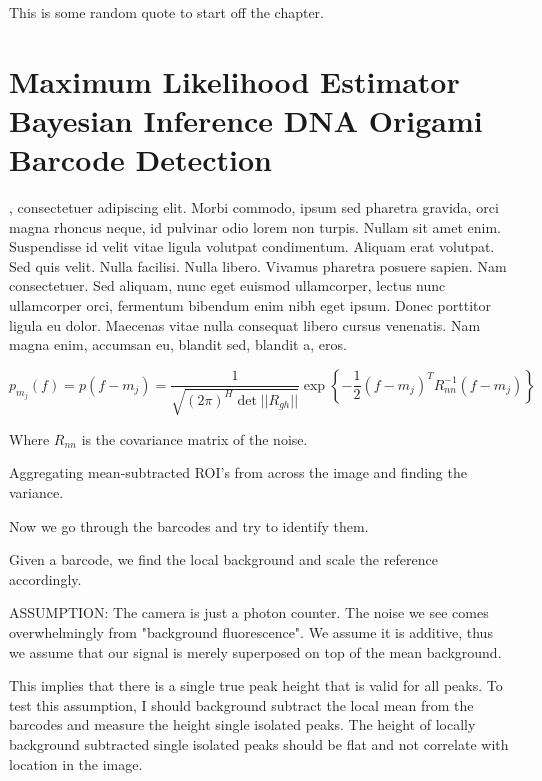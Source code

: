 \begin{savequote}[75mm] 
This is some random quote to start off the chapter.
\end{savequote}

\chapter{Maximum Likelihood Estimator Bayesian Inference DNA Origami Barcode Detection}

, consectetuer adipiscing elit. Morbi commodo, ipsum sed pharetra gravida, orci magna rhoncus neque, id pulvinar odio lorem non turpis. Nullam sit amet enim. Suspendisse id velit vitae ligula volutpat condimentum. Aliquam erat volutpat. Sed quis velit. Nulla facilisi. Nulla libero. Vivamus pharetra posuere sapien. Nam consectetuer. Sed aliquam, nunc eget euismod ullamcorper, lectus nunc ullamcorper orci, fermentum bibendum enim nibh eget ipsum. Donec porttitor ligula eu dolor. Maecenas vitae nulla consequat libero cursus venenatis. Nam magna enim, accumsan eu, blandit sed, blandit a, eros.



\begin{equation}
p_{m_j}(f)=p(f-m_j) = \frac{1}{  \sqrt{ (2\pi)^H \det || R_{gh}||} } \exp\left\{ -\frac{1}{2}  (f-m_j)^T R_{nn}^{-1} (f-m_j) \right\}
\end{equation}

Where $R_{nn}$ is the covariance matrix of the noise.




Aggregating mean-subtracted ROI's from across the image and finding the variance.

Now we go through the barcodes and try to identify them.

Given a barcode, we find the local background and scale the reference accordingly. 

ASSUMPTION: The camera is just a photon counter. The noise we see comes overwhelmingly from "background fluorescence". We assume it is additive, thus we assume that our signal is merely superposed on top of the mean background. 

This implies that there is a single true peak height that is valid for all peaks. To test this assumption, I should background subtract the local mean from the barcodes and measure the height single isolated peaks. The height of locally background subtracted single isolated peaks should be flat and not correlate with location in the image.

